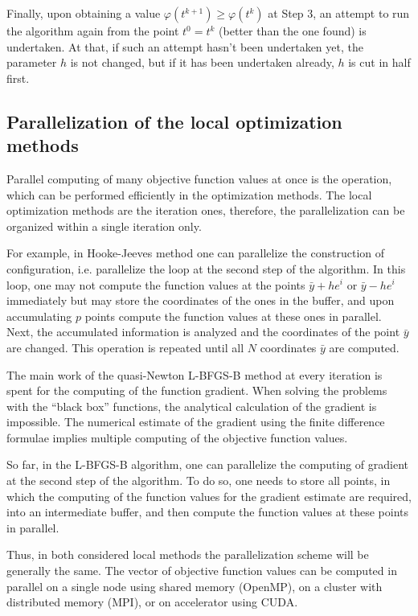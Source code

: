 \documentclass[runningheads]{llncs}
\begin{document}
Finally, upon obtaining a value $\varphi(t^{k+1}) \geq \varphi(t^k)$ at Step 3, an attempt to run the algorithm again from the point $t^0=t^k$ (better than the one found) is undertaken. At that, if such an attempt hasn't been undertaken yet, the parameter $h$ is not changed, but if it has been undertaken already, $h$ is cut in half first.

\subsection{Parallelization of the local optimization methods}

Parallel computing of many objective function values at once is the operation, which can be performed efficiently in the optimization methods. The local optimization methods are the iteration ones, therefore, the parallelization can be organized within a single iteration only.

For example, in Hooke-Jeeves method one can parallelize the construction of configuration, i.e. parallelize the loop at the second step of the algorithm. In this loop, one may not compute the function values at the points $\bar{y} + he^i$ or $\bar{y} - he^i$ immediately but may store the coordinates of the ones in the buffer, and upon accumulating $p$ points compute the function values at these ones in parallel. Next, the accumulated information is analyzed and the coordinates of the point $\bar{y}$ are changed. This operation is repeated until all $N$ coordinates $\bar{y}$ are computed.

The main work of the quasi-Newton L-BFGS-B method at every iteration is spent for the computing of the function gradient. When solving the problems with the ``black box'' functions, the analytical calculation of the gradient is impossible. The numerical estimate of the gradient using the finite difference formulae implies multiple computing of the objective function values.

So far, in the L-BFGS-B algorithm, one can parallelize the computing of gradient at the second step of the algorithm. To do so, one needs to store all points, in which the computing of the function values for the gradient estimate are required, into an intermediate buffer, and then compute the function values at these points in parallel.

Thus, in both considered local methods the parallelization scheme will be generally the same. The vector of objective function values can be computed in parallel on a single node using shared memory (OpenMP), on a cluster with distributed memory (MPI), or on accelerator using CUDA.
\end{document}

